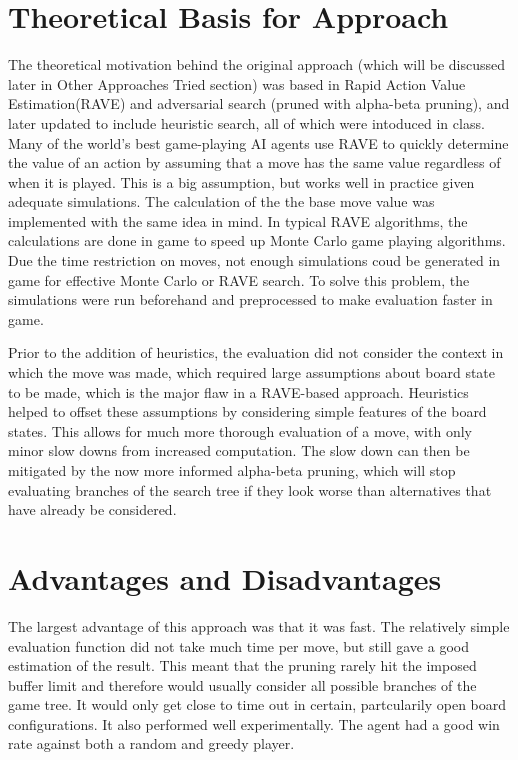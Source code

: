 \documentclass[11 pt, letter paper]{article}
\begin{document}
    \section{Theoretical Basis for Approach}
        The theoretical motivation behind the original approach (which will be discussed later in Other Approaches Tried section) was based in Rapid Action Value Estimation(RAVE)
        and adversarial search (pruned with alpha-beta pruning), and later updated to include heuristic search, all of which were intoduced in class.
        Many of the world's best game-playing AI agents use RAVE to quickly determine the value of an action
        by assuming that a move has the same value regardless of when it is played.
        This is a big assumption, but works well in practice given adequate simulations.
        The calculation of the the base move value was implemented with the same idea in  mind. In typical RAVE algorithms,
        the calculations are done in game to speed up Monte Carlo game playing algorithms.
        Due the time restriction on moves, not enough simulations coud be generated in game for effective Monte Carlo or RAVE search.
        To solve this problem, the simulations were run beforehand and preprocessed to make evaluation faster in game.

        Prior to the addition of heuristics, the evaluation did not consider the context in which the move was made,
        which required large assumptions about board state to be made, which is the major flaw in a RAVE-based approach.
        Heuristics helped to offset these assumptions by considering simple features of the board states. This allows for
        much more thorough evaluation of a move, with only minor slow downs from increased computation.
        The slow down can then be mitigated by the now more informed alpha-beta pruning,
        which will stop evaluating branches of the search tree if they look worse than alternatives that have already be considered.

    \section{Advantages and Disadvantages}
        The largest advantage of this approach was that it was fast.
        The relatively simple evaluation function did not take much time per move, but still gave a good estimation of the result.
        This meant that the pruning rarely hit the imposed buffer limit and therefore would usually
        consider all possible branches of the game tree. It would only get close to time out in certain, partcularily open board configurations.
        It also performed well experimentally. The agent had a good win rate against both a random and greedy player.
\end{document}
